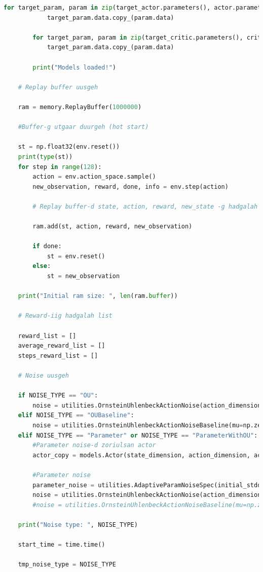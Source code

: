 \documentclass[12pt,A4]{report}
\begin{document}
\begin{lstlisting}[language=Python, caption=main.py, frame=single]
        for target_param, param in zip(target_actor.parameters(), actor.parameters()):
            target_param.data.copy_(param.data)

        for target_param, param in zip(target_critic.parameters(), critic.parameters()):
            target_param.data.copy_(param.data)

        print("Models loaded!")

    # Replay buffer uusgeh

    ram = memory.ReplayBuffer(1000000)

    #Buffer-g utgaar duurgeh (hot start)

    st = np.float32(env.reset())
    print(type(st))
    for step in range(128):
        action = env.action_space.sample()
        new_observation, reward, done, info = env.step(action)

        # Replay buffer-d state, action, reward, new_state -g hadgalah

        ram.add(st, action, reward, new_observation)

        if done:
            st = env.reset()
        else:
            st = new_observation

    print("Initial ram size: ", len(ram.buffer))

    # Reward-iig hadgalah list

    reward_list = []
    average_reward_list = []
    steps_reward_list = []

    # Noise uusgeh

    if NOISE_TYPE == "OU":
        noise = utilities.OrnsteinUhlenbeckActionNoise(action_dimension)
    elif NOISE_TYPE == "OUBaseline":
        noise = utilities.OrnsteinUhlenbeckActionNoiseBaseline(mu=np.zeros(action_dimension), sigma=float(0.2))
    elif NOISE_TYPE == "Parameter" or NOISE_TYPE == "ParameterWithOU":
        #Parameter noise-d zoriulsan actor
        actor_copy = models.Actor(state_dimension, action_dimension, action_max)

        #Parameter noise
        parameter_noise = utilities.AdaptiveParamNoiseSpec(initial_stddev=0.05,desired_action_stddev=0.3, adaptation_coefficient=1.05)
        noise = utilities.OrnsteinUhlenbeckActionNoise(action_dimension)
        #noise = utilities.OrnsteinUhlenbeckActionNoiseBaseline(mu=np.zeros(action_dimension), sigma=float(0.2))
        
    print("Noise type: ", NOISE_TYPE)

    start_time = time.time()

    tmp_noise_type = NOISE_TYPE


\end{lstlisting}
\end{document}
